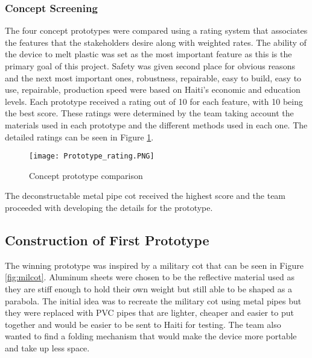 \documentclass[11pt,english]{article}
\begin{document}
\subsubsection{Concept Screening}
The four concept prototypes were compared using a rating system that associates the features that the stakeholders desire along with weighted rates. The ability of the device to melt plastic was set as the most important feature as this is the primary goal of this project. Safety was given second place for obvious reasons and the next most important ones, robustness, repairable, easy to build, easy to use, repairable, production speed were based on Haiti's economic and education levels. Each prototype received a rating out of 10 for each feature, with 10 being the best score. These ratings were determined by the team taking account the materials used in each prototype and the different methods used in each one. The detailed ratings can be seen in Figure \ref{fig:prototype_comparison}.\\

\begin{figure}[ht!]
\centering
\texttt{[image: Prototype\_rating.PNG]}
\caption{Concept prototype comparison}
\label{fig:prototype_comparison}
\end{figure}
\noindent The deconstructable metal pipe cot received the highest score and the team proceeded with developing the details for the prototype.
\subsection{Construction of First Prototype}

The winning prototype was inspired by a military cot that can be seen in Figure \ref{fig:milcot}. Aluminum sheets were chosen to be the reflective material used as they are stiff enough to hold their own weight but still able to be shaped as a parabola. The initial idea was to recreate the military cot using metal pipes but they were replaced with PVC pipes that are lighter, cheaper and easier to put together and would be easier to be sent to Haiti for testing. The team also wanted to find a folding mechanism that would make the device more portable and take up less space.\\
\end{document}
